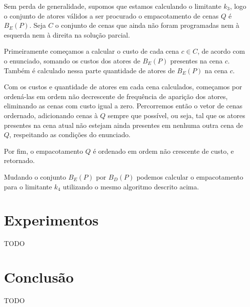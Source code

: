 \documentclass[a4paper,11pt]{article}
\begin{document}
Sem perda de generalidade, supomos que estamos calculando o
limitante $k_3$, logo o conjunto de atores válidos a ser procurado o empacotamento
de cenas $Q$ é $B_E(P)$. Seja $C$ o conjunto de cenas que ainda não foram programadas nem à esquerda nem
à direita na solução parcial.

Primeiramente começamos a calcular o custo de cada cena $c \in C$, de acordo com
o enunciado, somando os custos dos atores de $B_E(P)$ presentes na cena $c$. Também
é calculado nessa parte quantidade de atores de $B_E(P)$ na cena $c$.

Com os custos e quantidade de atores em cada cena calculados, começamos por ordená-las
em ordem não decrescente de frequência de aparição dos atores, eliminando
as cenas com custo igual a zero. Percorremos então o vetor de cenas ordernado,
adicionando cenas à $Q$ sempre que possível, ou seja, tal que os atores presentes
na cena atual não estejam ainda presentes em nenhuma outra cena de $Q$, respeitando as condições
do enunciado.

Por fim, o empacotamento $Q$ é ordenado em ordem não crescente de custo, e retornado.

Mudando o conjunto $B_E(P)$ por $B_D(P)$ podemos calcular o empacotamento para o
limitante $k_4$ utilizando o mesmo algoritmo descrito acima.

\section{Experimentos}
TODO

\section{Conclusão}
TODO
\end{document}
